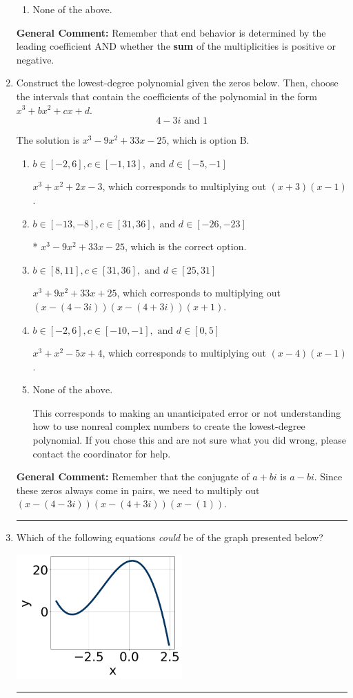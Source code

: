 \documentclass{extbook}[14pt]
\newcommand{\litem}[1]{\item #1

\rule{\textwidth}{0.4pt}}
\begin{document}
\begin{enumerate}
{\begin{enumerate}[label=\Alph*.]
\begin{multicols}{2}
\end{multicols}\item None of the above.\end{enumerate}
\textbf{General Comment:} Remember that end behavior is determined by the leading coefficient AND whether the \textbf{sum} of the multiplicities is positive or negative.
}
\litem{
Construct the lowest-degree polynomial given the zeros below. Then, choose the intervals that contain the coefficients of the polynomial in the form $x^3+bx^2+cx+d$.
\[ 4 - 3 i \text{ and } 1 \]

The solution is \( x^{3} -9 x^{2} +33 x -25 \), which is option B.\begin{enumerate}[label=\Alph*.]
\item \( b \in [-2, 6], c \in [-1, 13], \text{ and } d \in [-5, -1] \)

$x^{3} + x^{2} +2 x -3$, which corresponds to multiplying out $(x + 3)(x -1)$.
\item \( b \in [-13, -8], c \in [31, 36], \text{ and } d \in [-26, -23] \)

* $x^{3} -9 x^{2} +33 x -25$, which is the correct option.
\item \( b \in [8, 11], c \in [31, 36], \text{ and } d \in [25, 31] \)

$x^{3} +9 x^{2} +33 x + 25$, which corresponds to multiplying out $(x-(4 - 3 i))(x-(4 + 3 i))(x + 1)$.
\item \( b \in [-2, 6], c \in [-10, -1], \text{ and } d \in [0, 5] \)

$x^{3} + x^{2} -5 x + 4$, which corresponds to multiplying out $(x -4)(x -1)$.
\item \( \text{None of the above.} \)

This corresponds to making an unanticipated error or not understanding how to use nonreal complex numbers to create the lowest-degree polynomial. If you chose this and are not sure what you did wrong, please contact the coordinator for help.
\end{enumerate}

\textbf{General Comment:} Remember that the conjugate of $a+bi$ is $a-bi$. Since these zeros always come in pairs, we need to multiply out $(x-(4 - 3 i))(x-(4 + 3 i))(x-(1))$.
}
\litem{
Which of the following equations \textit{could} be of the graph presented below?

\begin{center}
    \includegraphics[width=0.5\textwidth]{../Figures/polyGraphToFunctionCopyB.png}
\end{center}




}
\end{enumerate}
\end{document}
